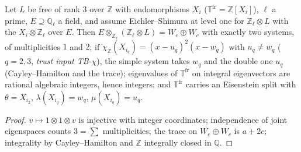 \begin{lemma}\label{inf:heckez-bridge}
  \leanok
  Let $L$ be free of rank $3$ over $\mathbb Z$ with endomorphisms $X_i$ ($\mathbb T^{\mathrm{fr}}=\mathbb Z[X_i]$), $\ell$ a prime, $E\supseteq\mathbb Q_\ell$ a
  field, and assume Eichler--Shimura at level one for $\mathbb Z_\ell\otimes L$ with the $X_i\otimes\mathbb Z_\ell$ over $E$. Then
  $E\otimes_{\mathbb Z_\ell}(\mathbb Z_\ell\otimes L)=W_e\oplus W_c$ with exactly two systems, of multiplicities $1$ and $2$; if
  $\chi_{\mathbb Z}(X_{i_q})=(x-u_q)^2(x-w_q)$ with $u_q\ne w_q$ ($q=2,3$, \emph{trust input TB-$\chi$}), the simple system takes $w_q$ and the double
  one $u_q$ (Cayley--Hamilton and the trace); eigenvalues of $\mathbb T^{\mathrm{fr}}$ on integral eigenvectors are rational algebraic
  integers, hence integers; and $\mathbb T^{\mathrm{fr}}$ carries an Eisenstein split with $\theta=X_{i_2}$, $\lambda(X_{i_q})=w_q$, $\mu(X_{i_q})=u_q$.
\end{lemma}
\begin{proof}
  \leanok
  $v\mapsto1\otimes1\otimes v$ is injective with integer coordinates; independence of joint eigenspaces counts $3=\sum$ multiplicities;
  the trace on $W_e\oplus W_c$ is $a+2c$; integrality by Cayley--Hamilton and $\mathbb Z$ integrally closed in $\mathbb Q$.
\end{proof}

